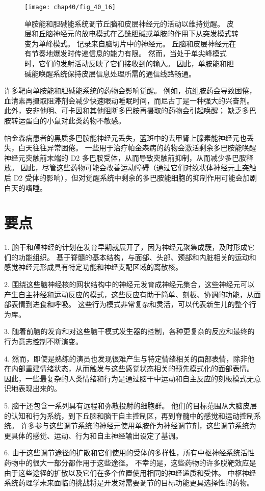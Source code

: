 \begin{figure}[htbp]
	\centering
	\texttt{[image: chap40/fig\_40\_16]}
	\caption{单胺能和胆碱能系统调节丘脑和皮层神经元的活动以维持觉醒。
		皮层和丘脑神经元的放电模式在乙酰胆碱或单胺的作用下从突发模式转变为单峰模式。
		记录来自脑切片中的神经元。
		丘脑和皮层神经元在有节奏地爆发时传递信息的能力有限。
		然而，当处于单尖峰模式时，它们的发射活动反映了它们接收到的输入。
		因此，单胺能和胆碱能唤醒系统保持皮层信息处理所需的通信线路畅通。}
	\label{fig:40_16}
\end{figure}


许多靶向单胺能和胆碱能系统的药物会影响觉醒。
例如，抗组胺药会导致困倦，血清素再摄取阻滞剂会减少快速眼动睡眠时间，而尼古丁是一种强大的兴奋剂。
此外，安非他明、可卡因和其他阻断多巴胺再摄取的药物会引起唤醒；
缺乏多巴胺转运蛋白的小鼠对此类药物不敏感。


帕金森病患者的黑质多巴胺能神经元丢失，蓝斑中的去甲肾上腺素能神经元也丢失，白天往往异常困倦。
一些用于治疗帕金森病的药物会激活剩余多巴胺能唤醒神经元突触前末端的 D2 多巴胺受体，从而导致突触前抑制，从而减少多巴胺释放。
因此，尽管这些药物可能会改善运动障碍（通过它们对纹状体神经元上突触后 D2 受体的影响），但对觉醒系统中剩余的多巴胺能细胞的抑制作用可能会加剧白天的嗜睡。



\section{要点}

1. 脑干和颅神经的计划在发育早期就展开了，因为神经元聚集成簇，及时形成它们的功能组织。
基于脊髓的基本结构，与面部、头部、颈部和内脏相关的运动和感觉神经元形成具有特定功能和神经支配区域的离散核。


2. 围绕这些脑神经核的网状结构中的神经元发育成神经元集合，这些神经元可以产生自主神经和运动反应的模式，这些反应有助于简单、刻板、协调的功能，从面部表情到进食和呼吸。
这些行为模式非常复杂和灵活，可以代表新生儿的整个行为库。


3. 随着前脑的发育和对这些脑干模式发生器的控制，各种更复杂的反应和最终的行为意志控制不断演变。


4. 然而，即使是熟练的演员也发现很难产生与特定情绪相关的面部表情，除非他在内部重建情绪状态，从而触发与这些感觉状态相关的预先模式化的面部表情。
因此，一些最复杂的人类情绪和行为是通过脑干中运动和自主反应的刻板模式无意识地表现出来的。


5. 脑干还包含一系列具有远程和弥散投射的细胞群。
他们的目标范围从大脑皮层的认知和行为系统，到下丘脑和脑干自主控制区，再到脊髓中的感觉和运动控制系统。
许多参与这些调节系统的神经元使用单胺作为神经调节剂，这些调节系统为更具体的感觉、运动、行为和自主神经输出设定了基调。


6. 由于这些调节途径的扩散和它们使用的受体的多样性，所有中枢神经系统活性药物中的很大一部分都作用于这些途径。
不幸的是，这些药物的许多脱靶效应是由于这些途径的扩散以及它们在多个位置使用相同的神经递质和受体。
中枢神经系统药理学未来面临的挑战将是开发对需要调节的目标功能更具选择性的药物。

